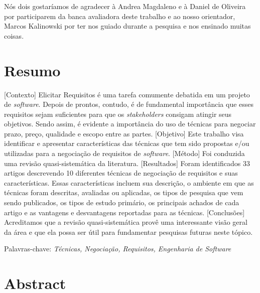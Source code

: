 \documentclass[a4paper,oneside,12pt]{book}
\begin{document}
Nós dois gostaríamos de agradecer à Andrea Magdaleno e à Daniel de Oliveira por
participarem da banca avaliadora deste trabalho e ao nosso orientador, Marcos
Kalinowski por ter nos guiado durante a pesquisa e nos ensinado muitas coisas.


\chapter*{Resumo}

\thispagestyle{myheadings}

[Contexto] Elicitar Requisitos é uma tarefa comumente debatida em um projeto de
\textit{software}. Depois de prontos, contudo, é de fundamental importância que
esses requisitos sejam suficientes para que os \textit{stakeholders} consigam atingir seus
objetivos. Sendo assim, é evidente a importância do uso de técnicas para
negociar prazo, preço, qualidade e escopo entre as partes. 
[Objetivo] Este trabalho visa identificar e apresentar características das técnicas que tem sido propostas e/ou utilizadas para a negociação 
de requisitos de \textit{software}. 
[Método] Foi conduzida uma revisão quasi-sistemática da literatura. 
[Resultados] Foram identificados 33 artigos descrevendo 10 diferentes técnicas
de negociação de requisitos e suas características. Essas características incluem sua descrição, o ambiente em que as técnicas foram descritas, avaliadas ou aplicadas, os tipos de pesquisa que vem sendo publicados, 
os tipos de estudo primário, os principais achados de cada artigo e as vantagens e desvantagens reportadas para as técnicas.
[Conclusões] Acreditamos que a revisão quasi-sistemática provê uma interessante visão geral da área e que ela possa ser útil para fundamentar pesquisas futuras neste tópico.


\bigskip
%

\noindent Palavras-chave: \textit{Técnicas, Negociação, Requisitos,
Engenharia de Software}


\chapter*{Abstract}
\end{document}
